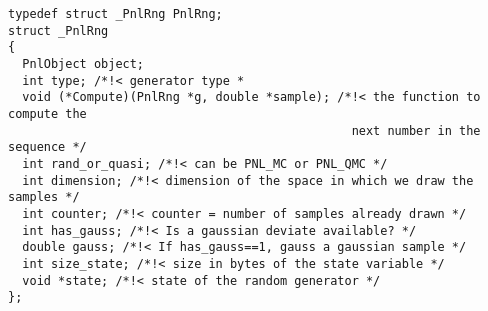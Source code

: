\begin{verbatim}
typedef struct _PnlRng PnlRng;
struct _PnlRng
{
  PnlObject object;
  int type; /*!< generator type *
  void (*Compute)(PnlRng *g, double *sample); /*!< the function to compute the
                                                next number in the sequence */
  int rand_or_quasi; /*!< can be PNL_MC or PNL_QMC */
  int dimension; /*!< dimension of the space in which we draw the samples */
  int counter; /*!< counter = number of samples already drawn */
  int has_gauss; /*!< Is a gaussian deviate available? */
  double gauss; /*!< If has_gauss==1, gauss a gaussian sample */
  int size_state; /*!< size in bytes of the state variable */
  void *state; /*!< state of the random generator */
};
\end{verbatim}


